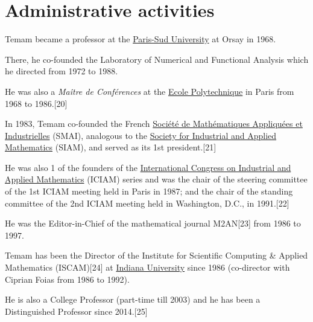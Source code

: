 \documentclass{book}
\numberwithin{equation}{section}
\begin{document}
\section{Administrative activities}
Temam became a professor at the \href{https://en.wikipedia.org/wiki/Paris-Sud_University}{Paris-Sud University} at Orsay in 1968.

There, he co-founded the Laboratory of Numerical and Functional Analysis which he directed from 1972 to 1988.

He was also a \textit{Maître de Conférences} at the \href{https://en.wikipedia.org/wiki/Ecole_Polytechnique}{Ecole Polytechnique} in Paris from 1968 to 1986.[20]

%
In 1983, Temam co-founded the French \href{https://en.wikipedia.org/wiki/Soci%C3%A9t%C3%A9_de_Math%C3%A9matiques_Appliqu%C3%A9es_et_Industrielles}{Société de Mathématiques Appliquées et Industrielles} (SMAI), analogous to the \href{https://en.wikipedia.org/wiki/Society_for_Industrial_and_Applied_Mathematics}{Society for Industrial and Applied Mathematics} (SIAM), and served as its 1st president.[21]
    
He was also 1 of the founders of the \href{https://en.wikipedia.org/wiki/International_Congress_on_Industrial_and_Applied_Mathematics}{International Congress on Industrial and Applied Mathematics} (ICIAM) series and was the chair of the steering committee of the 1st ICIAM meeting held in Paris in 1987; and the chair of the standing committee of the 2nd ICIAM meeting held in Washington, D.C., in 1991.[22]

He was the Editor-in-Chief of the mathematical journal M2AN[23] from 1986 to 1997.

%
Temam has been the Director of the Institute for Scientific Computing \& Applied Mathematics (ISCAM)[24] at \href{https://en.wikipedia.org/wiki/Indiana_University_Bloomington}{Indiana University} since 1986 (co-director with Ciprian Foias from 1986 to 1992).

He is also a College Professor (part-time till 2003) and he has been a Distinguished Professor since 2014.[25]
\end{document}

